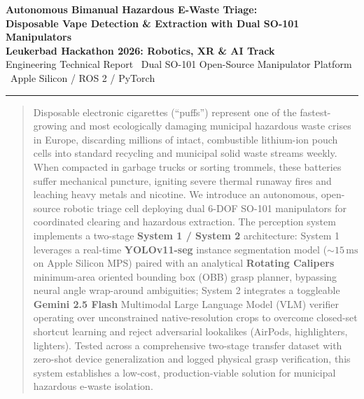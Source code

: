 \documentclass[10pt,a4paper]{article}
\begin{document}

\begin{center}
    {\Large\bfseries\color{primaryblue} Autonomous Bimanual Hazardous E-Waste Triage:}\\[0.18em]
    {\large\bfseries\color{secondaryblue} Disposable Vape Detection \& Extraction with Dual SO-101 Manipulators}\\[0.25em]
    {\small\textbf{Leukerbad Hackathon 2026: Robotics, XR \& AI Track}}\\[0.12em]
    {\footnotesize\color{darkslate} Engineering Technical Report \textbar\ Dual SO-101 Open-Source Manipulator Platform \textbar\ Apple Silicon / ROS 2 / PyTorch}
\end{center}
\vspace{-0.65em}
\hrule height 1.0pt
\vspace{0.45em}

\begin{abstract}
\noindent
Disposable electronic cigarettes (``puffs'') represent one of the fastest-growing and most ecologically damaging municipal hazardous waste crises in Europe, discarding millions of intact, combustible lithium-ion pouch cells into standard recycling and municipal solid waste streams weekly. When compacted in garbage trucks or sorting trommels, these batteries suffer mechanical puncture, igniting severe thermal runaway fires and leaching heavy metals and nicotine. We introduce an autonomous, open-source robotic triage cell deploying dual 6-DOF SO-101 manipulators for coordinated clearing and hazardous extraction. The perception system implements a two-stage \textbf{System 1 / System 2} architecture: System 1 leverages a real-time \textbf{YOLOv11-seg} instance segmentation model (${\sim}15\,\text{ms}$ on Apple Silicon MPS) paired with an analytical \textbf{Rotating Calipers} minimum-area oriented bounding box (OBB) grasp planner, bypassing neural angle wrap-around ambiguities; System 2 integrates a toggleable \textbf{Gemini 2.5 Flash} Multimodal Large Language Model (VLM) verifier operating over unconstrained native-resolution crops to overcome closed-set shortcut learning and reject adversarial lookalikes (AirPods, highlighters, lighters). Tested across a comprehensive two-stage transfer dataset with zero-shot device generalization and logged physical grasp verification, this system establishes a low-cost, production-viable solution for municipal hazardous e-waste isolation.
\end{abstract}
\vspace{-0.3em}
\end{document}
